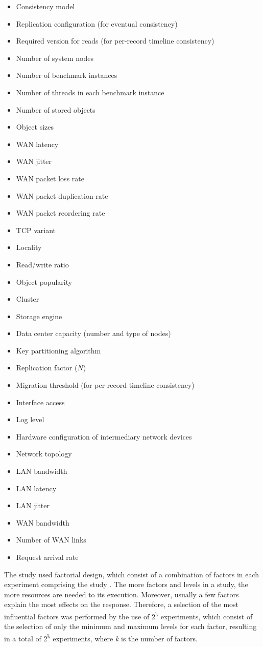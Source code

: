 \documentclass[man,floatsintext,12pt]{apa6}
\begin{document}
\begin{itemize}
\item Consistency model
\item Replication configuration (for eventual consistency)
\item Required version for reads (for per-record timeline consistency)
\item Number of system nodes
\item Number of benchmark instances
\item Number of threads in each benchmark instance
\item Number of stored objects
\item Object sizes
\item WAN latency
\item WAN jitter
\item WAN packet loss rate
\item WAN packet duplication rate
\item WAN packet reordering rate
\item TCP variant
\item Locality
\item Read/write ratio
\item Object popularity
\item Cluster
\item Storage engine
\item Data center capacity (number and type of nodes)
\item Key partitioning algorithm
\item Replication factor ($ N $)
\item Migration threshold (for per-record timeline consistency)
\item Interface access
\item Log level
\item Hardware configuration of intermediary network devices
\item Network topology
\item LAN bandwidth
\item LAN latency
\item LAN jitter
\item WAN bandwidth
\item Number of WAN links
\item Request arrival rate
\end{itemize}

The study used factorial design, which consist of a combination of factors in
each experiment comprising the study \parencite{Jain1991}. The more factors and
levels in a study, the more resources are needed to its execution.  Moreover,
usually a few factors explain the most effects on the response. Therefore, a
selection of the most influential factors was performed by the use of
2\textsuperscript{k} experiments, which consist of the selection of only the
minimum and maximum levels for each factor, resulting in a total of
2\textsuperscript{k} experiments, where \textit{k} is the number of factors.
\end{document}

